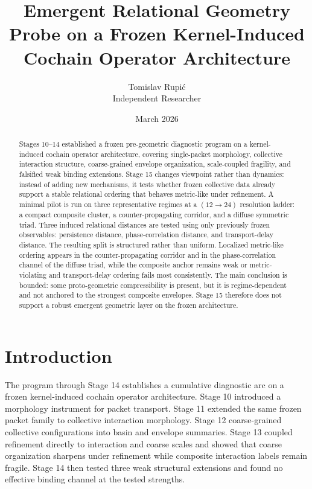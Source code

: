 \documentclass[11pt]{article}
\title{Emergent Relational Geometry Probe on a Frozen Kernel-Induced Cochain Operator Architecture}
\author{Tomislav Rupi\'c \\ Independent Researcher}
\date{March 2026}
\begin{document}
\maketitle

\begin{abstract}
Stages 10--14 established a frozen pre-geometric diagnostic program on a kernel-induced cochain operator architecture, covering single-packet morphology, collective interaction structure, coarse-grained envelope organization, scale-coupled fragility, and falsified weak binding extensions. Stage 15 changes viewpoint rather than dynamics: instead of adding new mechanisms, it tests whether frozen collective data already support a stable relational ordering that behaves metric-like under refinement. A minimal pilot is run on three representative regimes at a \((12 \rightarrow 24)\) resolution ladder: a compact composite cluster, a counter-propagating corridor, and a diffuse symmetric triad. Three induced relational distances are tested using only previously frozen observables: persistence distance, phase-correlation distance, and transport-delay distance. The resulting split is structured rather than uniform. Localized metric-like ordering appears in the counter-propagating corridor and in the phase-correlation channel of the diffuse triad, while the composite anchor remains weak or metric-violating and transport-delay ordering fails most consistently. The main conclusion is bounded: some proto-geometric compressibility is present, but it is regime-dependent and not anchored to the strongest composite envelopes. Stage 15 therefore does not support a robust emergent geometric layer on the frozen architecture.
\end{abstract}

\section{Introduction}

The program through Stage 14 establishes a cumulative diagnostic arc on a frozen kernel-induced cochain operator architecture. Stage 10 introduced a morphology instrument for packet transport. Stage 11 extended the same frozen packet family to collective interaction morphology. Stage 12 coarse-grained collective configurations into basin and envelope summaries. Stage 13 coupled refinement directly to interaction and coarse scales and showed that coarse organization sharpens under refinement while composite interaction labels remain fragile. Stage 14 then tested three weak structural extensions and found no effective binding channel at the tested strengths.
\end{document}
